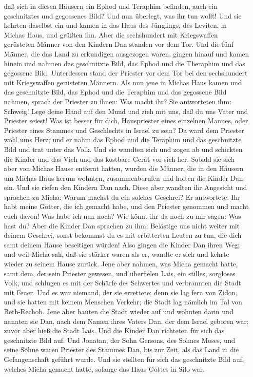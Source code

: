 daß sich in diesen Häusern ein Ephod und Teraphim befinden, auch ein
geschnitztes und gegossenes Bild? Und nun überlegt, was ihr tun wollt!
 Und sie kehrten daselbst ein und kamen in das Haus des
Jünglings, des Leviten, in Michas Haus, und grüßten ihn. 
Aber die sechshundert mit Kriegswaffen gerüsteten Männer von den Kindern
Dan standen vor dem Tor.  Und die fünf Männer, die das
Land zu erkundigen ausgezogen waren, gingen hinauf und kamen hinein und
nahmen das geschnitzte Bild, das Ephod und die Theraphim und das
gegossene Bild. Unterdessen stand der Priester vor dem Tor bei den
sechshundert mit Kriegswaffen gerüsteten Männern.  Als
nun jene in Michas Haus kamen und das geschnitzte Bild, das Ephod und
die Teraphim und das gegossene Bild nahmen, sprach der Priester zu
ihnen: Was macht ihr?  Sie antworteten ihm: Schweig! Lege
deine Hand auf den Mund und zieh mit uns, daß du uns Vater und Priester
seiest! Was ist besser für dich, Hauspriester eines einzelnen Mannes,
oder Priester eines Stammes und Geschlechts in Israel zu sein?
 Da ward dem Priester wohl ums Herz; und er nahm das
Ephod und die Teraphim und das geschnitzte Bild und trat unter das Volk.
 Und sie wandten sich und zogen ab und schickten die
Kinder und das Vieh und das kostbare Gerät vor sich her. 
Sobald sie sich aber von Michas Hause entfernt hatten, wurden die
Männer, die in den Häusern um Michas Haus herum wohnten, zusammenberufen
und holten die Kinder Dan ein.  Und sie riefen den
Kindern Dan nach. Diese aber wandten ihr Angesicht und sprachen zu
Micha: Warum machst du ein solches Geschrei?  Er
antwortete: Ihr habt meine Götter, die ich gemacht habe, und den
Priester genommen und macht euch davon! Was habe ich nun noch? Wie könnt
ihr da noch zu mir sagen: Was hast du?  Aber die Kinder
Dan sprachen zu ihm: Belästige uns nicht weiter mit deinem Geschrei,
sonst bekommst du es mit erbitterten Leuten zu tun, die dich samt deinem
Hause beseitigen würden!  Also gingen die Kinder Dan
ihren Weg; und weil Micha sah, daß sie stärker waren als er, wandte er
sich und kehrte wieder zu seinem Hause zurück.  Jene aber
nahmen, was Micha gemacht hatte, samt dem, der sein Priester gewesen,
und überfielen Lais, ein stilles, sorgloses Volk, und schlugen es mit
der Schärfe des Schwertes und verbrannten die Stadt mit Feuer.
 Und es war niemand, der sie errettete; denn sie lag fern
von Zidon, und sie hatten mit keinem Menschen Verkehr; die Stadt lag
nämlich im Tal von Beth-Rechob. Jene aber bauten die Stadt wieder auf
und wohnten darin  und nannten sie Dan, nach dem Namen
ihres Vaters Dan, der dem Israel geboren war; zuvor aber hieß die Stadt
Lais.  Und die Kinder Dan richteten für sich das
geschnitzte Bild auf. Und Jonatan, der Sohn Gersons, des Sohnes Moses,
und seine Söhne waren Priester des Stammes Dan, bis zur Zeit, als das
Land in die Gefangenschaft geführt wurde.  Und sie
stellten für sich das geschnitzte Bild auf, welches Micha gemacht hatte,
solange das Haus Gottes in Silo war.

